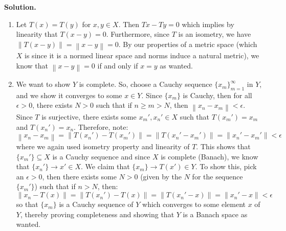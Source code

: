 \documentclass{article}
\newcommand{\norm}[1]{\left\lVert#1\right\rVert}
\begin{document}
    \textbf{Solution.}

    \begin{enumerate}
        \item Let $T(x) = T(y)$ for $x,y\in X$. Then $Tx - Ty = 0$ which implies by linearity that $T(x-y) = 0$. Furthermore,
            since $T$ is an isometry, we have $\norm{T(x-y)} = \norm{x-y} = 0$. By our properties of a metric space (which $X$ is since
            it is a normed linear space and norms induce a natural metric), we know that $\norm{x-y} = 0$ if and only if $x=y$ as wanted.
        \item We want to show $Y$ is complete. So, choose a Cauchy sequence $\{x_m\}_{m=1}^{\infty}$ in $Y$, and we show it converges
            to some $x\in Y$. Since $\{x_m\}$ is Cauchy, then for all $\epsilon>0$, there exists $N>0$ such that if $n\geq m>N$, then
            $\norm{x_n-x_m}<\epsilon$. Since $T$ is surjective, there exists some $x_m',x_n'\in X$ such that $T(x_m') = x_m$ and
            $T(x_n') = x_n$. Therefore, note:
            \[ \norm{x_n - x_m} = \norm{T(x_n')-T(x_m')} = \norm{T(x_n'-x_m')} = \norm{x_n'-x_m'} < \epsilon \]
            where we again used isometry property and linearity of $T$. This shows that $\{x_m'\}\subseteq X$ is a Cauchy sequence
            and since $X$ is complete (Banach), we know that $\{x_n'\}\to x'\in X$. We claim that $\{x_m\}\to T(x')\in Y$. To show
            this, pick an $\epsilon>0$, then there exists some $N>0$ (given by the $N$ for the sequence $\{x_m'\}$) such that
            if $n>N$, then:
            \[ \norm{x_n - T(x)} = \norm{T(x_n') - T(x)} = \norm{T(x_n'-x)} = \norm{x_n' - x} < \epsilon \]
            so that $\{x_m\}$ is a Cauchy sequence of $Y$ which converges to some element $x$ of $Y$, thereby proving completeness
            and showing that $Y$ is a Banach space as wanted.
    \end{enumerate}
\end{document}
